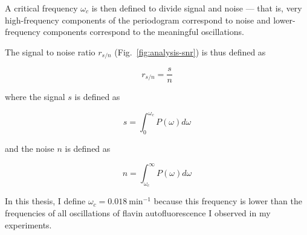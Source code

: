 A critical frequency $\omega_{c}$ is then defined to divide signal and noise --- that is, very high-frequency components of the periodogram correspond to noise and lower-frequency components correspond to the meaningful oscillations.

The signal to noise ratio $r_{s/n}$ (Fig.\ \ref{fig:analysis-snr}) is thus defined as

\begin{equation}
  r_{s/n} = \frac{s}{n}
  \label{eq:snr}
\end{equation}

where the signal $s$ is defined as

\begin{equation}
  s = \int_{0}^{\omega_{c}} P(\omega) d\omega
  \label{eq:signal}
\end{equation}

and the noise $n$ is defined as

\begin{equation}
  n = \int_{\omega_{c}}^{\infty} P(\omega) d\omega
  \label{eq:noise}
\end{equation}

In this thesis, I define $\omega_{c} = \SI{0.018}{\minute^{-1}}$ because this frequency is lower than the frequencies of all oscillations of flavin autofluorescence I observed in my experiments.


